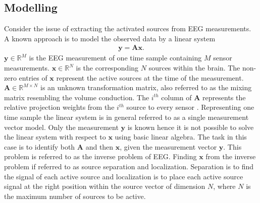 %     


\subsection{Modelling}
Consider the issue of extracting the activated sources from EEG measurements. A known approach is to model the observed data by a linear system 
\begin{align*}
\mathbf{y} = \mathbf{Ax}.
\end{align*}
$\mathbf{y} \in \mathbb{R}^{M}$ is the EEG measurement of one time sample containing $M$ sensor measurements. $\mathbf{x} \in \mathbb{R}^{N}$ is the corresponding $N$ sources within the brain. 
The non-zero entries of $\textbf{x}$ represent the active sources at the time of the measurement. 
$\mathbf{A} \in \mathbb{R}^{M \times N}$ is an unknown transformation matrix, also referred to as the mixing matrix resembling the volume conduction. 
The $i^{th}$ column of $\mathbf{A}$ represents the relative projection weights from the $i^{th}$ source to every sensor \cite{phd2015}. 
Representing one time sample the linear system is in general referred to as a single measurement vector model. 
Only the measurement $\textbf{y}$ is known hence it is not possible to solve the linear system with respect to $\textbf{x}$ using basic linear algebra.   
The task in this case is to identify both $\mathbf{A}$ and then $\mathbf{x}$, given the measurement vector $\mathbf{y}$. This problem is referred to as the inverse problem of EEG. 
Finding $\textbf{x}$ from the inverse problem if referred to as source separation and localization. Separation is to find the signal of each active source and localization is to place each active source signal at the right position within the source vector of dimension $N$, where $N$ is the maximum number of sources to be active.      

